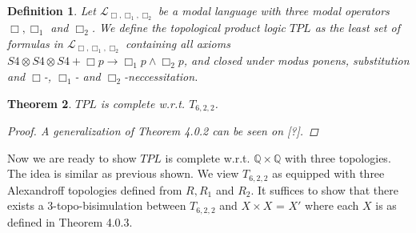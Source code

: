 \documentclass[12pt, a4paper]{scrartcl}
\newtheorem{definition}{Definition}[subsection]
\newtheorem{theorem}[definition]{Theorem}
\begin{document}
\begin{definition}
    Let $\mathcal{L}_{\Box,\Box_1,\Box_2}$ be a modal language with three modal operators $\Box, \Box_1$ and $\Box_2$.
    We define the topological product logic $TPL$ as the least set of formulas in $\mathcal{L}_{\Box,\Box_1,\Box_2}$ containing all axioms
    $S4 \otimes S4 \otimes S4 + \Box p \rightarrow \Box_1 p \land \Box_2 p$, and closed under modus ponens, substitution and $\Box$-, $\Box_1$- and $\Box_2$-neccessitation.  
\end{definition}

\begin{theorem}
    $TPL$ is complete w.r.t. $T_{6,2,2}$.
    \begin{proof}
        A generalization of Theorem 4.0.2 can be seen on [?].
    \end{proof}
\end{theorem}

Now we are ready to show $TPL$ is complete w.r.t. $\mathbb{Q} \times \mathbb{Q}$ with three topologies. The idea is similar as previous shown.
We view $T_{6,2,2}$ as equipped with three Alexandroff topologies defined from $R, R_1$ and $R_2$. It suffices to show 
that there exists a 3-topo-bisimulation between $T_{6,2,2}$ and $X \times X$ = $X'$ where each $X$ is as defined in Theorem 4.0.3. 
\end{document}
